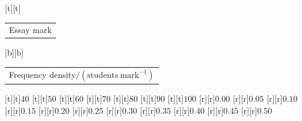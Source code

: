 %    
%
%
\begin{psfrags}%
\psfragscanon%
%
[t][t]{\color[rgb]{0,0,0}\setlength{\tabcolsep}{0pt}\begin{tabular}{c}\Large{}Essay mark\end{tabular}}%
[b][b]{\color[rgb]{0,0,0}\setlength{\tabcolsep}{0pt}\begin{tabular}{c}\Large{}Frequency density$/(\mathrm{students\ mark^{-1}})$\end{tabular}}%
%
[t][t]{$40$}%
[t][t]{$50$}%
[t][t]{$60$}%
[t][t]{$70$}%
[t][t]{$80$}%
[t][t]{$90$}%
[t][t]{$100$}%
%
[r][r]{$0.00$}%
[r][r]{$0.05$}%
[r][r]{$0.10$}%
[r][r]{$0.15$}%
[r][r]{$0.20$}%
[r][r]{$0.25$}%
[r][r]{$0.30$}%
[r][r]{$0.35$}%
[r][r]{$0.40$}%
[r][r]{$0.45$}%
[r][r]{$0.50$}%
%
%
\end{psfrags}%
%
